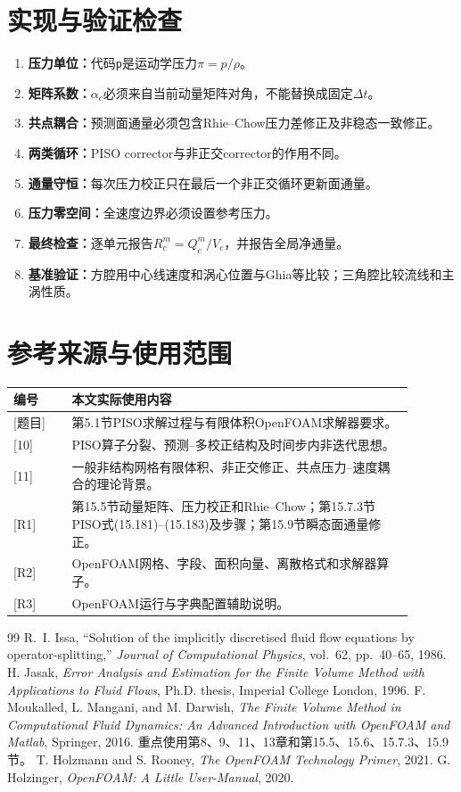 \documentclass[UTF8,12pt,a4paper]{ctexart}
\numberwithin{equation}{section}
\newcommand{\dt}{\Delta t}
\newcommand{\Task}{\textnormal{[题目]}}
\newcommand{\Issa}{\textnormal{[10]}}
\newcommand{\Jasak}{\textnormal{[11]}}
\newcommand{\Rone}{\textnormal{[R1]}}
\newcommand{\Rtwo}{\textnormal{[R2]}}
\newcommand{\Rthree}{\textnormal{[R3]}}
\begin{document}
\section{实现与验证检查}
\begin{enumerate}
  \item \textbf{压力单位：}代码\texttt{p}是运动学压力$\pi=p/\rho$。
  \item \textbf{矩阵系数：}$\alpha_c$必须来自当前动量矩阵对角，不能替换成固定$\dt$。
  \item \textbf{共点耦合：}预测面通量必须包含Rhie--Chow压力差修正及非稳态一致修正。
  \item \textbf{两类循环：}PISO corrector与非正交corrector的作用不同。
  \item \textbf{通量守恒：}每次压力校正只在最后一个非正交循环更新面通量。
  \item \textbf{压力零空间：}全速度边界必须设置参考压力。
  \item \textbf{最终检查：}逐单元报告$R_c^m=Q_c^m/V_c$，并报告全局净通量。
  \item \textbf{基准验证：}方腔用中心线速度和涡心位置与Ghia等比较；三角腔比较流线和主涡性质。
\end{enumerate}

\section{参考来源与使用范围}
\begin{longtable}{p{0.13\linewidth}p{0.76\linewidth}}
\toprule
编号 & 本文实际使用内容\\
\midrule
\Task & 第5.1节PISO求解过程与有限体积OpenFOAM求解器要求。\\
\Issa & PISO算子分裂、预测--多校正结构及时间步内非迭代思想。\\
\Jasak & 一般非结构网格有限体积、非正交修正、共点压力--速度耦合的理论背景。\\
\Rone & 第15.5节动量矩阵、压力校正和Rhie--Chow；第15.7.3节PISO式(15.181)--(15.183)及步骤；第15.9节瞬态面通量修正。\\
\Rtwo & OpenFOAM网格、字段、面积向量、离散格式和求解器算子。\\
\Rthree & OpenFOAM运行与字典配置辅助说明。\\
\bottomrule
\end{longtable}

\begin{thebibliography}{99}
R.~I. Issa,
“Solution of the implicitly discretised fluid flow equations by operator-splitting,”
\emph{Journal of Computational Physics}, vol.~62, pp.~40--65, 1986.
H. Jasak,
\emph{Error Analysis and Estimation for the Finite Volume Method with Applications to Fluid Flows},
Ph.D. thesis, Imperial College London, 1996.
F. Moukalled, L. Mangani, and M. Darwish,
\emph{The Finite Volume Method in Computational Fluid Dynamics: An Advanced Introduction with OpenFOAM and Matlab},
Springer, 2016. 重点使用第8、9、11、13章和第15.5、15.6、15.7.3、15.9节。
T. Holzmann and S. Rooney, \emph{The OpenFOAM Technology Primer}, 2021.
G. Holzinger, \emph{OpenFOAM: A Little User-Manual}, 2020.
\end{thebibliography}
\end{document}

